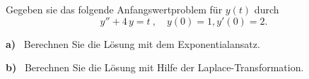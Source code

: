 



{
Gegeben sie das folgende Anfangswertproblem für $y(t)$ durch
$$	y'' + 4\,y = t\ ,\quad y(0)= 1, y'(0)=2.$$

\textbf{a)} \ Berechnen Sie die Lösung mit dem Exponentialansatz.

\textbf{b)} \ Berechnen Sie die Lösung mit Hilfe der Laplace-Transformation.

}

